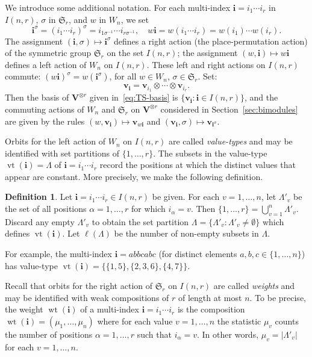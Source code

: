 \documentclass[10pt]{article}
\theoremstyle{definition}
\newtheorem{defi}[theorem]{Definition}
\DeclareMathOperator{\vt}{vt}
\DeclareMathOperator{\wt}{wt}
\newcommand{\Sym}{\mathfrak{S}}
\newcommand{\bi}{{\boldsymbol{i}}} %
\newcommand{\V}{\mathbf{V}} %
\newcommand{\bv}{\mathbf{v}} %
\begin{document}
We introduce some additional notation. For each multi-index $\bi =
i_1\cdots i_r$ in $I(n,r)$, $\sigma$ in $\Sym_r$, and $w$ in $W_n$, we
set
\[
 \bi^\sigma = (i_1\cdots i_r)^\sigma = i_{1 \sigma^{-1}} \cdots
 i_{r \sigma^{-1}}, \quad w \bi = w(i_1 \cdots i_r) = w(i_1) \cdots w(i_r).
\] 
The assignment $(\bi , \sigma) \mapsto \bi^\sigma$ defines a right
action (the place-permutation action) of the symmetric group $\Sym_r$
on the set $I(n,r)$; the assignment $(w,\bi) \mapsto w \bi$ defines a
left action of $W_n$ on $I(n,r)$. These left and right actions on
$I(n,r)$ commute: $(w\bi)^\sigma = w(\bi^\sigma)$, for all $w \in
W_n$, $\sigma \in \Sym_r$. Set:
\begin{equation}
 \bv_\bi = \bv_{i_1} \otimes \cdots \otimes \bv_{i_r}.
\end{equation}
Then the basis of $\V^{\otimes r}$ given in~\eqref{eq:TS-basis} is
$\{\bv_\bi: \bi \in I(n,r)\}$, and the commuting actions of $W_n$ and
$\Sym_r$ on $\V^{\otimes r}$ considered in Section~\ref{sec:bimodules}
are given by the rules $(w, \bv_\bi) \mapsto \bv_{w\bi}$ and
$(\bv_\bi, \sigma) \mapsto \bv_{\bi^\sigma}$.

Orbits for the left action of $W_n$ on $I(n,r)$ are called
\emph{value-types} and may be identified with set partitions of $\{1,
\dots, r\}$. The subsets in the value-type $\vt(\bi) = \Lambda$ of
$\bi = i_1 \cdots i_r$ record the positions at which the distinct
values that appear are constant. More precisely, we make the following
definition.

\begin{defi}\label{def:value-type}
 Let $\bi = i_1 \cdots i_r \in I(n,r)$ be given. For each $v =
 1, \dots, n$, let $\Lambda'_v$ be the set of all positions
 $\alpha = 1, \dots, r$ for which $i_\alpha = v$. Then $\{1, \dots,
 r\} = \bigcup_{v=1}^n \Lambda'_v$. Discard any empty $\Lambda'_v$ to
 obtain the set partition $\Lambda = \{ \Lambda'_v : \Lambda'_v \ne
 \emptyset\}$ which defines $\vt(\bi)$. Let $\ell(\Lambda)$ be the
 number of non-empty subsets in $\Lambda$.
\end{defi}

For example, the multi-index $\bi = abbcabc$ (for distinct elements
$a,b,c \in \{1, \dots, n\}$) has value-type $\vt(\bi) = \{\{1,5\},
\{2,3,6\}, \{4,7\}\}$.

Recall that orbits for the right action of $\Sym_r$ on $I(n,r)$ are
called \emph{weights} and may be identified with weak compositions of
$r$ of length at most $n$. To be precise, the weight $\wt(\bi)$ of a
multi-index $\bi = i_1 \cdots i_r$ is the composition $\wt(\bi) =
(\mu_1, \dots, \mu_n)$ where for each value $v = 1, \dots, n$ the
statistic $\mu_v$ counts the number of positions $\alpha = 1, \dots,
r$ such that $i_\alpha = v$. In other words, $\mu_v = |\Lambda'_v|$
for each $v = 1, \dots, n$.
\end{document}
